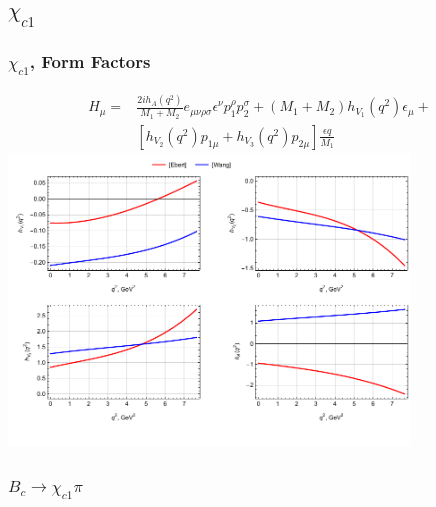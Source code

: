 \documentclass{beamer}
\begin{document}
\subsection{$\chi_{c1}$}
\begin{frame}
  \frametitle{$\chi_{c1}$, Form Factors}
  \begin{align*}
    \label{eq:1}
    H_\mu =& \frac{2i h_A(q^2)}{M_1+M_2}e_{\mu\nu\rho\sigma}\epsilon^\nu p_1^\rho p_2^\sigma
             + (M_1+M_2) h_{V_1}(q^2)\epsilon_\mu + \\
     & [h_{V_2}(q^2)p_{1\mu} + h_{V_3}(q^2)p_{2\mu}]\frac{\epsilon q}{M_1}
  \end{align*}
  \includegraphics[width=0.8\textwidth]{figs/ff_chi_c1}
\end{frame}

\begin{frame}
  \frametitle{$B_c \to \chi_{c1} \pi$}
  \begin{columns}
    \begin{column}{0.5\textwidth}
      \centering{[Ebert]:}
      
    \end{column}
    \begin{column}{0.5\textwidth}
      \centering{[Wang]:}
      
    \end{column}
  \end{columns}
\end{frame}
\end{document}
